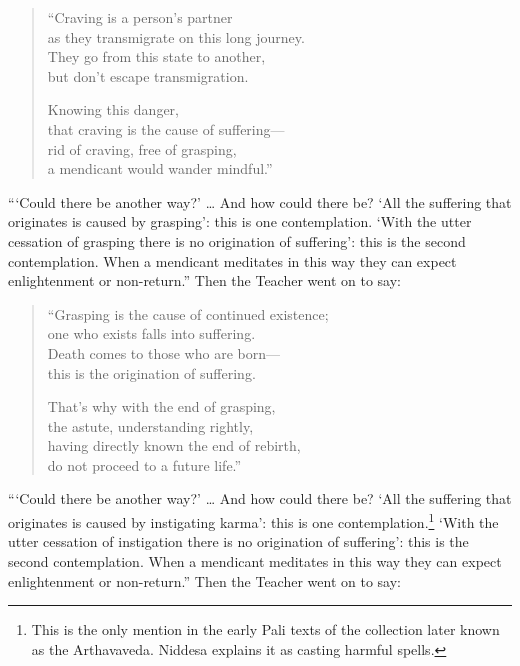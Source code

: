 \documentclass[12pt,openany]{book}%
\begin{document}
\begin{verse}%
“Craving is a person’s partner \\
as they transmigrate on this long journey. \\
They go from this state to another, \\
but don’t escape transmigration. 

Knowing this danger, \\
that craving is the cause of suffering—\\
rid of craving, free of grasping, \\
a mendicant would wander mindful.” 

%
\end{verse}

“‘Could there be another way?’ … And how could there be? ‘All the suffering that originates is caused by grasping’: this is one contemplation. ‘With the utter cessation of grasping there is no origination of suffering’: this is the second contemplation. When a mendicant meditates in this way they can expect enlightenment or non-return.” Then the Teacher went on to say: 

\begin{verse}%
“Grasping is the cause of continued existence; \\
one who exists falls into suffering. \\
Death comes to those who are born—\\
this is the origination of suffering. 

That’s why with the end of grasping, \\
the astute, understanding rightly, \\
having directly known the end of rebirth, \\
do not proceed to a future life.” 

%
\end{verse}

“‘Could there be another way?’ … And how could there be? ‘All the suffering that originates is caused by instigating karma’: this is one contemplation.\footnote{This is the only mention in the early Pali texts of the collection later known as the Arthavaveda. Niddesa explains it as casting harmful spells. } ‘With the utter cessation of instigation there is no origination of suffering’: this is the second contemplation. When a mendicant meditates in this way they can expect enlightenment or non-return.” Then the Teacher went on to say: 
\end{document}
